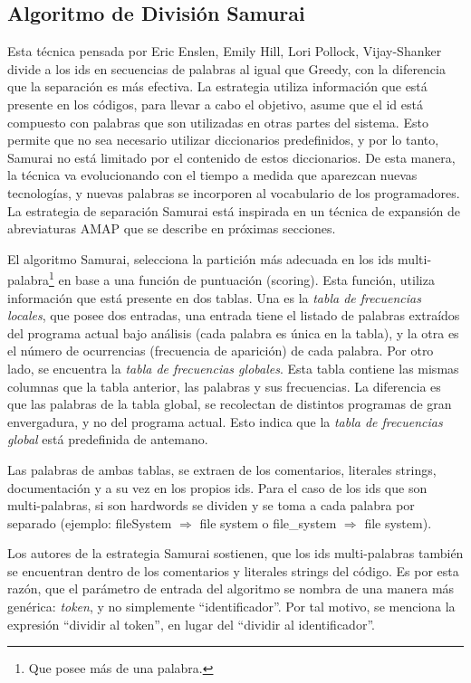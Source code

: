 \subsection{Algoritmo de División Samurai}
\label{sec:algSamu}

Esta técnica pensada por Eric Enslen, Emily Hill, Lori Pollock, Vijay-Shanker \cite{EHPV09} divide a los ids en secuencias de palabras al igual que Greedy, con la diferencia que la separación es más efectiva. La estrategia utiliza información que está presente en los códigos, para llevar a cabo el objetivo, asume que el id está compuesto con palabras que son utilizadas en otras partes del sistema. Esto permite que no sea necesario utilizar diccionarios predefinidos, y por lo tanto, Samurai no está limitado por el contenido de estos diccionarios. De esta manera, la técnica va evolucionando con el tiempo a medida que aparezcan nuevas tecnologías, y nuevas palabras se incorporen al vocabulario de los programadores.
La estrategia de separación Samurai está inspirada en un técnica de expansión de abreviaturas AMAP \cite{EZH08} que se describe en próximas secciones.

El algoritmo Samurai, selecciona la partición más adecuada en los ids multi-palabra\footnote[1]{Que posee más de una palabra.} en base a una función de puntuación (scoring). Esta función, utiliza información que está presente en dos tablas.
Una es la \textit{tabla de frecuencias locales}, que posee dos entradas, una entrada tiene el listado de palabras extraídos del programa actual bajo análisis (cada palabra es única en la tabla), y la otra es el número de ocurrencias (frecuencia de aparición) de cada palabra.
Por otro lado, se encuentra la \textit{tabla de frecuencias globales}. Esta tabla contiene las mismas columnas que la tabla anterior, las palabras y sus frecuencias. La diferencia es que las palabras de la tabla global, se recolectan de distintos programas de gran envergadura, y no del programa actual. Esto indica que la \textit{tabla de frecuencias global} está predefinida de antemano.

Las palabras de ambas tablas, se extraen de los comentarios, literales strings, documentación y a su vez en los propios ids. Para el caso de los ids que son multi-palabras, si son hardwords se dividen y se toma a cada palabra por separado (ejemplo: \textsf{fileSystem} $\Rightarrow$ \textsf{file system} o \textsf{file\_system} $\Rightarrow$ \textsf{file system}).

Los autores de la estrategia Samurai sostienen, que los ids multi-palabras también se encuentran dentro de los comentarios y literales strings del código. Es por esta razón, que el parámetro de entrada del algoritmo se nombra de una manera más genérica: \textit{token}, y no simplemente “identificador”. Por tal motivo, se menciona la expresión “dividir al token”, en lugar del “dividir al identificador”.

